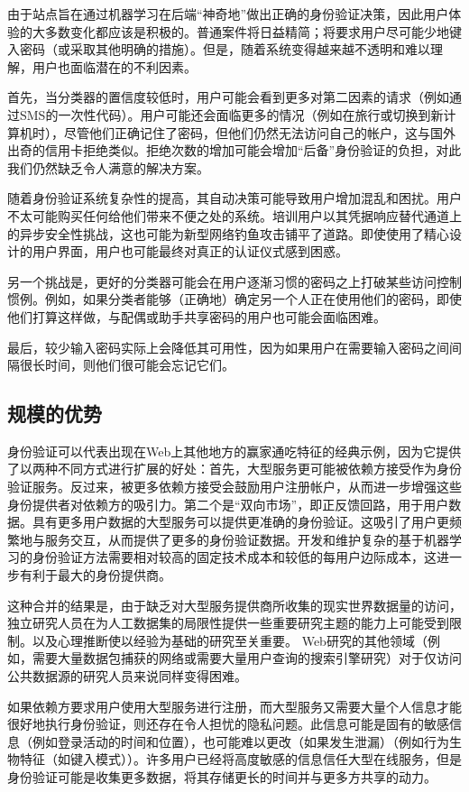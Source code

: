由于站点旨在通过机器学习在后端“神奇地”做出正确的身份验证决策，因此用户体验的大多数变化都应该是积极的。普通案件将日益精简；将要求用户尽可能少地键入密码（或采取其他明确的措施）。但是，随着系统变得越来越不透明和难以理解，用户也面临潜在的不利因素。

首先，当分类器的置信度较低时，用户可能会看到更多对第二因素的请求（例如通过SMS的一次性代码）。用户可能还会面临更多的情况（例如在旅行或切换到新计算机时），尽管他们正确记住了密码，但他们仍然无法访问自己的帐户，这与国外出奇的信用卡拒绝类似。拒绝次数的增加可能会增加“后备”身份验证的负担，对此我们仍然缺乏令人满意的解决方案。

随着身份验证系统复杂性的提高，其自动决策可能导致用户增加混乱和困扰。用户不太可能购买任何给他们带来不便之处的系统。培训用户以其凭据响应替代通道上的异步安全性挑战，这也可能为新型网络钓鱼攻击铺平了道路。即使使用了精心设计的用户界面，用户也可能最终对真正的认证仪式感到困惑。

另一个挑战是，更好的分类器可能会在用户逐渐习惯的密码之上打破某些访问控制惯例。例如，如果分类者能够（正确地）确定另一个人正在使用他们的密码，即使他们打算这样做，与配偶或助手共享密码的用户也可能会面临困难。

最后，较少输入密码实际上会降低其可用性，因为如果用户在需要输入密码之间间隔很长时间，则他们很可能会忘记它们。

\subsection{规模的优势}

身份验证可以代表出现在Web上其他地方的赢家通吃特征的经典示例，因为它提供了以两种不同方式进行扩展的好处：首先，大型服务更可能被依赖方接受作为身份验证服务。反过来，被更多依赖方接受会鼓励用户注册帐户，从而进一步增强这些身份提供者对依赖方的吸引力。第二个是“双向市场”，即正反馈回路，用于用户数据。具有更多用户数据的大型服务可以提供更准确的身份验证。这吸引了用户更频繁地与服务交互，从而提供了更多的身份验证数据。开发和维护复杂的基于机器学习的身份验证方法需要相对较高的固定技术成本和较低的每用户边际成本，这进一步有利于最大的身份提供商。

这种合并的结果是，由于缺乏对大型服务提供商所收集的现实世界数据量的访问，独立研究人员在为人工数据集的局限性提供一些重要研究主题的能力上可能受到限制。以及心理推断使以经验为基础的研究至关重要。 Web研究的其他领域（例如，需要大量数据包捕获的网络或需要大量用户查询的搜索引擎研究）对于仅访问公共数据源的研究人员来说同样变得困难。

如果依赖方要求用户使用大型服务进行注册，而大型服务又需要大量个人信息才能很好地执行身份验证，则还存在令人担忧的隐私问题。此信息可能是固有的敏感信息（例如登录活动的时间和位置），也可能难以更改（如果发生泄漏）（例如行为生物特征（如键入模式））。许多用户已经将高度敏感的信息信任大型在线服务，但是身份验证可能是收集更多数据，将其存储更长的时间并与更多方共享的动力。

